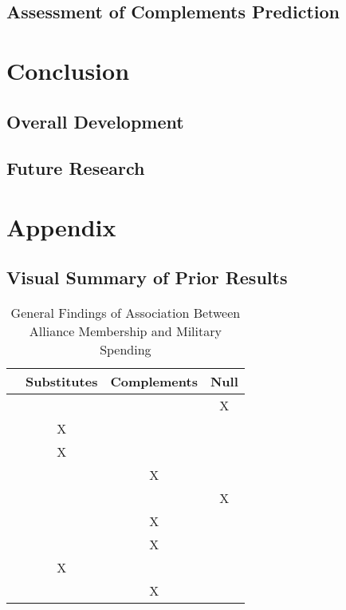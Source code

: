 \documentclass[12pt]{article}
\begin{document}
\subsection{Assessment of Complements Prediction} 






\section{Conclusion}



\subsection{Overall Development}




\subsection{Future Research}





\section*{Appendix}

\subsection*{Visual Summary of Prior Results} 


\begin{table}[hbt!]
\begin{tabular}{lccc}
     & Substitutes & Complements & Null \\
\hline
\citet{MostSiverson1987} &  &  & X \\
\citet{Morrow1993} & X &  &  \\ 
\citet{Conybeare1994} & X & &  \\
\citet{Diehl1994} &  & X &  \\
\citet{Goldsmith2003} &  &  & X \\
\citet{MorganPalmer2006} &  & X & \\ 
\citet{QuirozFlores2011} &  & X &  \\ 
\citet{DigiuseppePoast2016} & X & & \\ 
\citet{Horowitzetal2017} &  & X & \\ 
\hline
\end{tabular}
\caption{General Findings of Association Between Alliance Membership and Military Spending}
\end{table}
\end{document}
